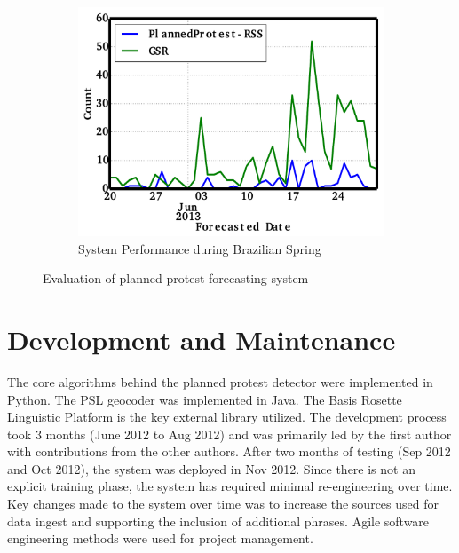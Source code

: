 \documentclass[letterpaper]{article}
\begin{document}
\begin{figure}
\begin{subfigure}{.70\columnwidth}
  \includegraphics[scale=0.2]{brazil_june}
  \vspace{-0.5em}
  \caption{\scriptsize System Performance during Brazilian Spring}
  \label{fig:brazil_june}
\end{subfigure}\hspace{.5pt}
\caption{Evaluation of planned protest forecasting system}
\end{figure}


\vspace{-1em}
\section{Development and Maintenance}
The core algorithms behind the
planned protest detector were implemented in Python. The PSL geocoder was
implemented in Java. The Basis Rosette Linguistic Platform is the key
external library utilized. The development process took 3 months (June
2012 to Aug 2012) and was
primarily led by the first author with contributions from the other authors.
After two months of testing (Sep 2012 and Oct 2012), the system was deployed
in Nov 2012. Since there is not an explicit training
phase, the system has required minimal re-engineering over time. Key changes
made to the system over time was to increase the sources used for data ingest
and supporting the inclusion of additional phrases. Agile software
engineering methods were used for project management.
\end{document}
